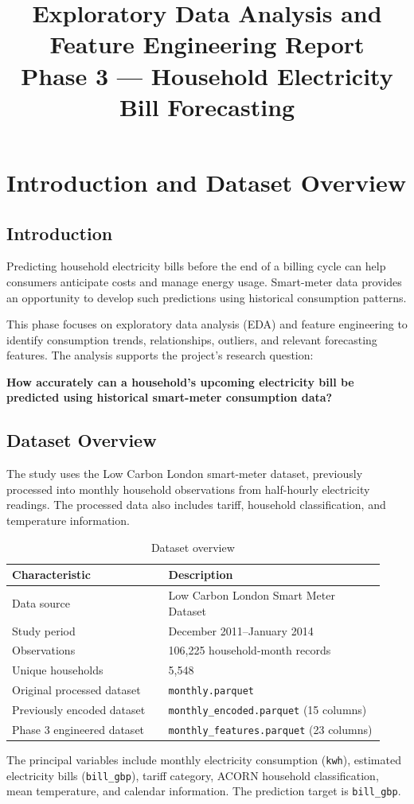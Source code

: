 \documentclass[11pt,a4paper]{article}
\title{Exploratory Data Analysis and Feature Engineering Report\\\large Phase 3 --- Household Electricity Bill Forecasting}
\author{}
\date{}
\begin{document}
\maketitle
\vspace{-1.2cm}
\section{Introduction and Dataset Overview}
\subsection{Introduction}
Predicting household electricity bills before the end of a billing cycle can help consumers anticipate costs and manage energy usage. Smart-meter data provides an opportunity to develop such predictions using historical consumption patterns.

This phase focuses on exploratory data analysis (EDA) and feature engineering to identify consumption trends, relationships, outliers, and relevant forecasting features. The analysis supports the project's research question:

\textbf{How accurately can a household's upcoming electricity bill be predicted using historical smart-meter consumption data?}
\subsection{Dataset Overview}
The study uses the Low Carbon London smart-meter dataset, previously processed into monthly household observations from half-hourly electricity readings. The processed data also includes tariff, household classification, and temperature information.
\begin{table}[H]\centering\caption{Dataset overview}\small
\begin{tabular}{@{}p{0.39\linewidth}p{0.54\linewidth}@{}}\toprule
Characteristic & Description\\\midrule
Data source & Low Carbon London Smart Meter Dataset\\
Study period & December 2011--January 2014\\
Observations & 106,225 household-month records\\
Unique households & 5,548\\
Original processed dataset & \texttt{monthly.parquet}\\
Previously encoded dataset & \texttt{monthly\_encoded.parquet} (15 columns)\\
Phase 3 engineered dataset & \texttt{monthly\_features.parquet} (23 columns)\\\bottomrule
\end{tabular}\end{table}
The principal variables include monthly electricity consumption (\texttt{kwh}), estimated electricity bills (\texttt{bill\_gbp}), tariff category, ACORN household classification, mean temperature, and calendar information. The prediction target is \texttt{bill\_gbp}.
\end{document}

